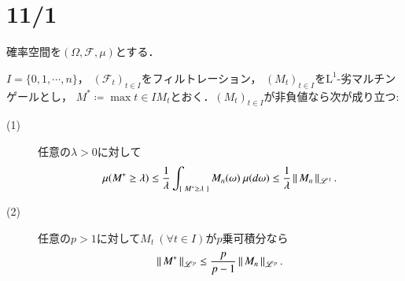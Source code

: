 \section{11/1}
	確率空間を$(\Omega,\mathcal{F},\mu)$とする．
	
	\begin{itembox}[l]{}
		\begin{thm}[Doobの不等式(1)]
			$I=\{0,1,\cdots,n\}$，
			$(\mathcal{F}_t)_{t \in I}$をフィルトレーション，
			$(M_t)_{t \in I}$を$\mathrm{L}^1$-劣マルチンゲールとし，
			$M^* \coloneqq \max{t \in I}{M_t}$とおく．$(M_t)_{t \in I}$が非負値なら次が成り立つ:
			\begin{description}
				\item[(1)] 任意の$\lambda > 0$に対して
					\begin{align}
						\mu(M^* \geq \lambda) \leq \frac{1}{\lambda} \int_{\left\{\ M^* \geq \lambda\ \right\}} M_n(\omega)\ \mu(d\omega)
						\leq \frac{1}{\lambda} \left\|\, M_n\, \right\|_{\mathscr{L}^1}.
					\end{align}
				\item[(2)] 任意の$p > 1$に対して$M_t\ (\forall t \in I)$が$p$乗可積分なら
					\begin{align}
						\left\|\, M^*\, \right\|_{\mathscr{L}^p} \leq \frac{p}{p-1} \left\|\, M_n\, \right\|_{\mathscr{L}^p}.
					\end{align}
			\end{description}
		\end{thm}
	\end{itembox}
	
